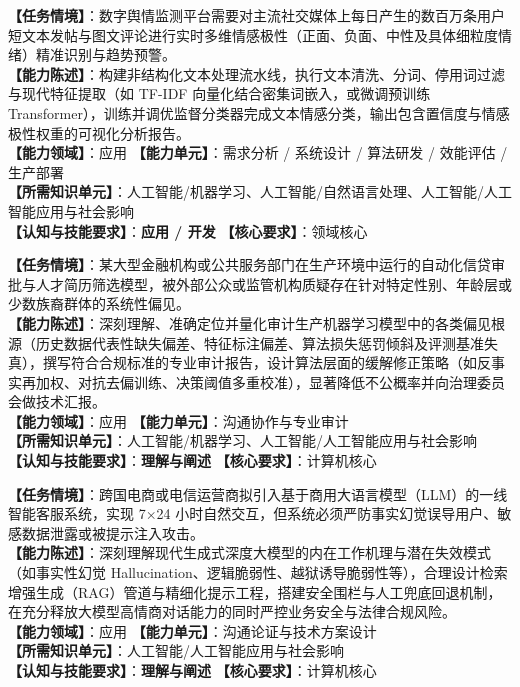 \begin{taskbox}
\textbf{【任务情境】}：数字舆情监测平台需要对主流社交媒体上每日产生的数百万条用户短文本发帖与图文评论进行实时多维情感极性（正面、负面、中性及具体细粒度情绪）精准识别与趋势预警。\\
\textbf{【能力陈述】}：构建非结构化文本处理流水线，执行文本清洗、分词、停用词过滤与现代特征提取（如 TF-IDF 向量化结合密集词嵌入，或微调预训练 Transformer），训练并调优监督分类器完成文本情感分类，输出包含置信度与情感极性权重的可视化分析报告。\\
\textbf{【能力领域】}：应用 \quad \textbf{【能力单元】}：需求分析 / 系统设计 / 算法研发 / 效能评估 / 生产部署\\
\textbf{【所需知识单元】}：人工智能/机器学习、人工智能/自然语言处理、人工智能/人工智能应用与社会影响\\
\textbf{【认知与技能要求】}：\textbf{应用 / 开发} \quad \textbf{【核心要求】}：领域核心
\end{taskbox}

\begin{taskbox}[任务 9：已部署机器学习系统的数据集偏差与算法偏见审计校正]
\textbf{【任务情境】}：某大型金融机构或公共服务部门在生产环境中运行的自动化信贷审批与人才简历筛选模型，被外部公众或监管机构质疑存在针对特定性别、年龄层或少数族裔群体的系统性偏见。\\
\textbf{【能力陈述】}：深刻理解、准确定位并量化审计生产机器学习模型中的各类偏见根源（历史数据代表性缺失偏差、特征标注偏差、算法损失惩罚倾斜及评测基准失真），撰写符合合规标准的专业审计报告，设计算法层面的缓解修正策略（如反事实再加权、对抗去偏训练、决策阈值多重校准），显著降低不公概率并向治理委员会做技术汇报。\\
\textbf{【能力领域】}：应用 \quad \textbf{【能力单元】}：沟通协作与专业审计\\
\textbf{【所需知识单元】}：人工智能/机器学习、人工智能/人工智能应用与社会影响\\
\textbf{【认知与技能要求】}：\textbf{理解与阐述} \quad \textbf{【核心要求】}：计算机核心
\end{taskbox}

\begin{taskbox}
\textbf{【任务情境】}：跨国电商或电信运营商拟引入基于商用大语言模型（LLM）的一线智能客服系统，实现 7$\times$24 小时自然交互，但系统必须严防事实幻觉误导用户、敏感数据泄露或被提示注入攻击。\\
\textbf{【能力陈述】}：深刻理解现代生成式深度大模型的内在工作机理与潜在失效模式（如事实性幻觉 Hallucination、逻辑脆弱性、越狱诱导脆弱性等），合理设计检索增强生成（RAG）管道与精细化提示工程，搭建安全围栏与人工兜底回退机制，在充分释放大模型高情商对话能力的同时严控业务安全与法律合规风险。\\
\textbf{【能力领域】}：应用 \quad \textbf{【能力单元】}：沟通论证与技术方案设计\\
\textbf{【所需知识单元】}：人工智能/人工智能应用与社会影响\\
\textbf{【认知与技能要求】}：\textbf{理解与阐述} \quad \textbf{【核心要求】}：计算机核心
\end{taskbox}

